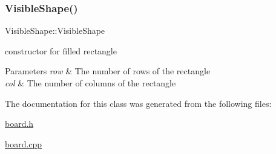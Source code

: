 \subsubsection{\texorpdfstring{Visible\+Shape()}{VisibleShape()}\hspace{0.1cm}{\footnotesize\ttfamily [3/3]}}
{\footnotesize\ttfamily Visible\+Shape\+::\+Visible\+Shape}



constructor for filled rectangle 


\begin{DoxyParams}{Parameters}
{\em row} & The number of rows of the rectangle \\
\hline
{\em col} & The number of columns of the rectangle \\
\hline
\end{DoxyParams}


The documentation for this class was generated from the following files\+:\begin{DoxyCompactItemize}
\item 
\mbox{\hyperlink{board_8h}{board.\+h}}\item 
\mbox{\hyperlink{board_8cpp}{board.\+cpp}}\end{DoxyCompactItemize}
